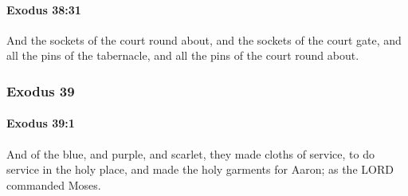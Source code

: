 		\paragraph{Exodus 38:31} %
			\label{EXODUS-38-31}

			And the sockets of the court round about, and the sockets of the court gate, and all the pins of the tabernacle, and all the pins of the court round about.

	\subsubsection{Exodus 39} %
		\label{EXODUS-39}

		\paragraph{Exodus 39:1} %
			\label{EXODUS-39-1}

			And of the blue, and purple, and scarlet, they made cloths of service, to do service in the holy place, and made the holy garments for Aaron; as the LORD commanded Moses.

